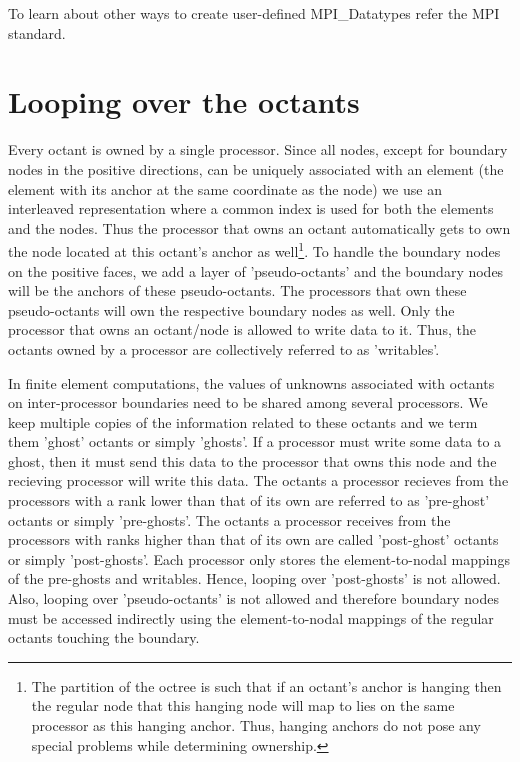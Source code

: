\documentclass[12pt,reqno,a4paper]{report}
\numberwithin{equation}{section}
\begin{document}
To learn about other ways to create user-defined MPI\_Datatypes refer the MPI standard.

\section{Looping over the octants}
\label{sec:loops}
Every octant is owned by a single processor. Since all nodes, except for boundary nodes in the positive directions, can be uniquely associated with an element (the element with its anchor at the same coordinate as the node) we use an interleaved representation where a common index is used for both the elements and the nodes. Thus the processor that owns an octant automatically gets to own the node located at this octant's anchor as well\footnote{The partition of the octree is such that if an octant's anchor is hanging then the regular node that this hanging node will map to lies on the same processor as this hanging anchor. Thus, hanging anchors do not pose any special problems while determining ownership.}. To handle the boundary nodes on the positive faces, we add a layer of 'pseudo-octants' and the boundary nodes will be the anchors of these pseudo-octants. The processors that own these pseudo-octants will own the respective boundary nodes as well. Only the processor that owns an octant/node is allowed to write data to it. Thus, the octants owned by a processor are collectively referred to as 'writables'.

In finite element computations, the values of unknowns associated with octants on inter-processor boundaries need to be shared among several processors. We keep multiple copies of the information related to these octants and we term them 'ghost' octants or simply 'ghosts'. If a processor must write some data to a ghost, then it must send this data to the processor that owns this node and the recieving processor will write this data. The octants a processor recieves from the processors with a rank lower than that of its own are referred to as 'pre-ghost' octants or simply 'pre-ghosts'. The octants a processor receives from the processors with ranks higher than that of its own are called 'post-ghost' octants or simply 'post-ghosts'. Each processor only stores the element-to-nodal mappings of the pre-ghosts and writables. Hence, looping over 'post-ghosts' is not allowed. Also, looping over 'pseudo-octants' is not allowed and therefore boundary nodes must be accessed indirectly using the element-to-nodal mappings of the regular octants touching the boundary.
\end{document}
